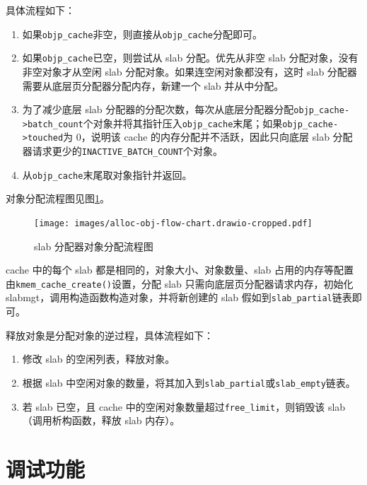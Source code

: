 \documentclass[AutoFakeBold]{LZUThesis}
\begin{document}
\begin{sloppypar}
具体流程如下：

\begin{enumerate}
\def\labelenumi{\arabic{enumi}.}
\item
  如果\texttt{objp\_cache}非空，则直接从\texttt{objp\_cache}分配即可。
\item
  如果\texttt{objp\_cache}已空，则尝试从 slab 分配。优先从非空 slab
  分配对象，没有非空对象才从空闲 slab
  分配对象。如果连空闲对象都没有，这时 slab
  分配器需要从底层页分配器分配内存，新建一个 slab 并从中分配。
\item
  为了减少底层 slab
  分配器的分配次数，每次从底层分配器分配\texttt{objp\_cache-\textgreater{}batch\_count}个对象并将其指针压入\texttt{objp\_cache}末尾；如果\texttt{objp\_cache-\textgreater{}touched}为
  0，说明该 cache 的内存分配并不活跃，因此只向底层 slab
  分配器请求更少的\texttt{INACTIVE\_BATCH\_COUNT}个对象。
\item
  从\texttt{objp\_cache}末尾取对象指针并返回。
\end{enumerate}

对象分配流程图见图\ref{figure:slab-allocator-obj-alloc-flow-chart}。

\begin{figure}[htb]
\centering
\texttt{[image: images/alloc-obj-flow-chart.drawio-cropped.pdf]}
\caption{slab 分配器对象分配流程图}
\label{figure:slab-allocator-obj-alloc-flow-chart}
\end{figure}

cache 中的每个 slab 都是相同的，对象大小、对象数量、slab
占用的内存等配置由\texttt{kmem\_cache\_create()}设置，分配 slab
只需向底层页分配器请求内存，初始化
slabmgt，调用构造函数构造对象，并将新创建的 slab
假如到\texttt{slab\_partial}链表即可。

释放对象是分配对象的逆过程，具体流程如下：

\begin{enumerate}
\def\labelenumi{\arabic{enumi}.}
\item
  修改 slab 的空闲列表，释放对象。
\item
  根据 slab
  中空闲对象的数量，将其加入到\texttt{slab\_partial}或\texttt{slab\_empty}链表。
\item
  若 slab 已空，且 cache
  中的空闲对象数量超过\texttt{free\_limit}，则销毁该
  slab（调用析构函数，释放 slab 内存）。
\end{enumerate}


\section{调试功能}


\end{sloppypar}
\end{document}
